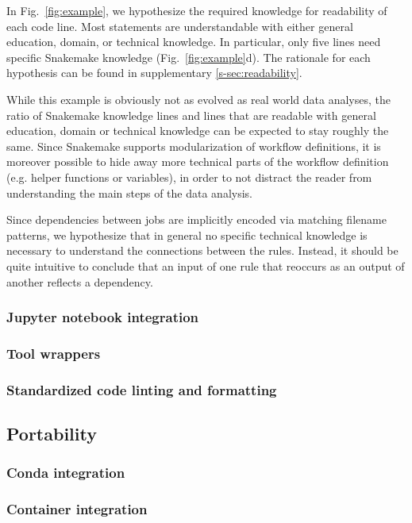\documentclass[parskip=half]{scrartcl}
\begin{document}
In Fig.~{\ref{fig:example}}, we hypothesize the required knowledge for readability of each code line.
Most statements are understandable with either general education, domain, or technical knowledge.
In particular, only five lines need specific Snakemake knowledge (Fig.~{\ref{fig:example}}d).
The rationale for each hypothesis can be found in supplementary \autoref{s-sec:readability}.

While this example is obviously not as evolved as real world data analyses, the ratio of Snakemake knowledge lines and lines that are readable with general education, domain or technical knowledge can be expected to stay roughly the same.
Since Snakemake supports modularization of workflow definitions, it is moreover possible to hide away more technical parts of the workflow definition (e.g. helper functions or variables), in order to not distract the reader from understanding the main steps of the data analysis.

Since dependencies between jobs are implicitly encoded via matching filename patterns, we hypothesize that in general no specific technical knowledge is necessary to understand the connections between the rules.
Instead, it should be quite intuitive to conclude that an input of one rule that reoccurs as an output of another reflects a dependency.

\subsubsection{Jupyter notebook integration}

\subsubsection{Tool wrappers}\label{sec:wrappers}

\subsubsection{Standardized code linting and formatting}

\subsection{Portability}

\subsubsection{Conda integration}

\subsubsection{Container integration}
\end{document}
